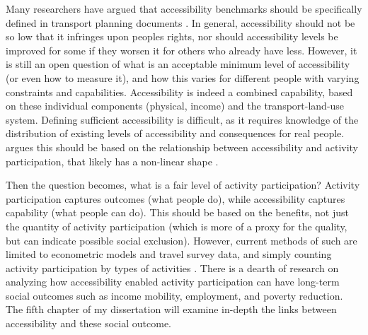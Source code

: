 Many researchers have argued that accessibility benchmarks should be specifically defined in transport planning documents \cite{manaugh_integrating_2015}. In general, accessibility should not be so low that it infringes upon peoples rights, nor should accessibility levels be improved for some if they worsen it for others who already have less. However, it is still an open question of what is an acceptable minimum level of accessibility  (or even how to measure it), and how this varies for different people with varying constraints and capabilities. Accessibility is indeed a combined capability, based on these individual components (physical, income) and the transport-land-use system. Defining sufficient accessibility is difficult, as it requires knowledge of the distribution of existing levels of accessibility and consequences for real people.  argues this should be based on the relationship between accessibility and activity participation, that likely has a non-linear shape \cite{allen_planning_2020}. 

Then the question becomes, what is a fair level of activity participation? Activity participation captures outcomes (what people do), while accessibility captures capability (what people can do). This should be based on the benefits, not just the quantity of activity participation (which is more of a proxy for the quality, but can indicate possible social exclusion).  However, current methods of such are limited to econometric models and travel survey data, and simply counting activity participation by types of activities \cite{fransen_spatio-temporal_2018,allen_planning_2020}. There is a dearth of research on analyzing how accessibility enabled activity participation can have long-term social outcomes such as income mobility, employment, and poverty reduction. The fifth chapter of my dissertation will examine in-depth the links between accessibility and these social outcome. 




